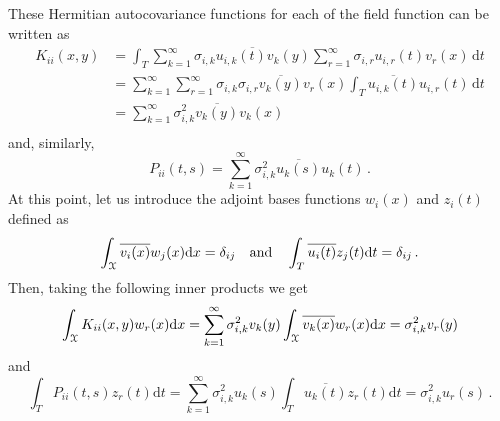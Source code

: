 \documentclass[10pt]{article}
\newcommand{\norm}[1]{\left\Vert#1\right\Vert}
\begin{document}

These Hermitian autocovariance functions for each of the field function can be written as 
\begin{equation}
\begin{aligned}
    K_{ii}(x,y) 
    & =  
    \int_T 
    \sum_{k=1}^\infty \overline{\sigma_{i,k} u_{i,k}(t)v_{k}(y)} 
    \sum_{r=1}^\infty \sigma_{i,r} u_{i,r}(t) v_{r}(x)\, \mathrm{d} t\\
    & =  
    \sum_{k=1}^\infty \sum_{r=1}^\infty 
     {\sigma_{i,k}}\sigma_{i,r}\overline{v_{k}(y)} v_{r}(x)
    \int_T 
    \overline{ u_{i,k}(t)} 
    u_{i,r}(t)\, \mathrm{d} t\\
    & =  
    \sum_{k=1}^\infty
     \sigma_{i,k}^2\overline{v_{k}(y)} v_{k}(x)\\
\end{aligned}
\end{equation}
and, similarly,
\begin{equation}
    P_{ii}(t,s) =  
    \sum_{k=1}^\infty
    \sigma_{i,k}^2\overline{u_{k}(s)} u_{k}(t)\,.
\end{equation}
At this point, let us introduce the adjoint bases functions $w_i(x)$ and $z_i(t)$ defined as
\begin{equation}
    \int_{\cal X} \overline{v_{i}(x)} w_j(x) \mathrm{d} x = \delta_{ij} \quad \mathrm{and} \quad 
    \int_T \overline{u_{i}(t)} z_j(t) \mathrm{d} t = \delta_{ij}\,.
\end{equation}
Then, taking the following inner products we get
\begin{equation}\label{sp1}
    \int_{\cal X} K_{ii}(x,y) w_r(x) \mathrm{d} x = \sum_{k=1}^\infty
    \sigma_{i,k}^2  v_{k}(y) 
    \int_{\cal X} \overline{v_{k}(x)} w_r(x) \mathrm{d} x = \sigma_{i,k}^2 v_{r}(y)  
\end{equation}
and
\begin{equation}\label{sp2}
    \int_T P_{ii}(t,s) z_r(t) \mathrm{d} t = \sum_{k=1}^\infty
    \sigma_{i,k}^2  u_{k}(s) 
    \int_T \overline{u_{k}(t)} z_r(t) \mathrm{d} t = \sigma_{i,k}^2 u_{r}(s)  \,.
\end{equation}
\end{document}
